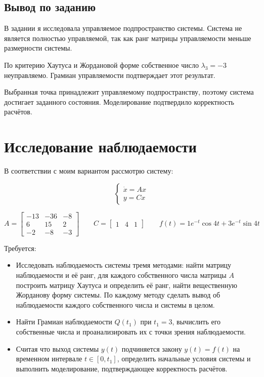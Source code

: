 \documentclass[a4paper,12pt]{article}
\begin{document}
	
	
	\newpage
	\subsection{Вывод по заданию}
	
	В задании я исследовала управляемое подпространство системы.
	Система не является полностью управляемой,
	так как ранг матрицы управляемости меньше размерности системы.
	
	По критерию Хаутуса и Жордановой форме
	собственное число $\lambda_3=-3$ неуправляемо.
	Грамиан управляемости подтверждает этот результат.
	
	Выбранная точка принадлежит управляемому подпространству,
	поэтому система достигает заданного состояния.
	Моделирование подтвердило корректность расчётов.
	
	
	
	\newpage
	\newpage
	\section{Исследование наблюдаемости}
	\label{sec:task3}
	
	В соответствии с моим вариантом рассмотрю систему:
	
	\[
	\begin{cases}
		\dot{x} = Ax \\
		y = Cx
	\end{cases}
	\]
	
	\[
	A = 
	\begin{bmatrix}
		-13 & -36 & -8 \\
		6 & 15 & 2 \\
		-2 & -8 & -3
	\end{bmatrix}
	\qquad C = 
	\begin{bmatrix}
		1 & 4 & 1
	\end{bmatrix}
	\qquad f(t) = 1 e^{-t} \cos 4t + 3 e^{-t} \sin 4t 
	\]
	
	Требуется:
	
	\begin{itemize}
		\item Исследовать наблюдаемость системы тремя методами: найти матрицу 
		наблюдаемости и её ранг, для каждого собственного числа матрицы $A$ 
		построить матрицу Хаутуса и определить её ранг, найти вещественную 
		Жорданову форму системы. По каждому методу сделать вывод об 
		наблюдаемости каждого собственного числа и системы в целом.
		\item Найти Грамиан наблюдаемости $Q(t_1)$ при $t_1 = 3$, вычислить 
		его собственные числа и проанализировать их с точки зрения наблюдаемости.
		\item Считая что выход системы $y(t)$ подчиняется закону $y(t) = f(t)$ 
		на временном интервале $t \in [0, t_1]$, определить начальные условия 
		системы и выполнить моделирование, подтверждающее корректность расчётов.
	\end{itemize}
	
\end{document}
